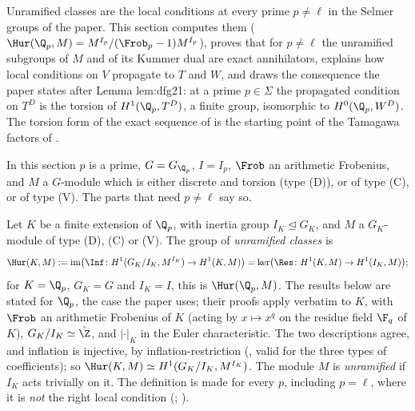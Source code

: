 Unramified classes are the local conditions at every prime $p\ne\ell$ in the Selmer groups of the paper. This section computes them
($\Hur(\Q_p,M)=M^{I_p}/(\Frob_p-1)M^{I_p}$), proves that for $p\ne\ell$ the unramified subgroups of $M$ and of its Kummer dual are exact annihilators, explains how local
conditions on $V$ propagate to $T$ and $W$, and draws the consequence the paper states after Lemma lem:dfg21: at a prime $p\in\Sigma$ the propagated condition
on $T^D$ is the torsion of $H^1(\Q_p,T^D)$, a finite group, isomorphic to $H^0(\Q_p,W^D)$. The torsion form of the exact sequence of 
is the starting point of the Tamagawa factors of .

In this section $p$ is a prime, $G=G_{\Q_p}$, $I=I_p$, $\Frob$ an arithmetic Frobenius, and $M$ a $G$-module which is either discrete and torsion (type (D)), or of
type (C), or of type (V). The parts that need $p\ne\ell$ say so.

\begin{definition}\label{def:galcoh:unramified}
Let $K$ be a finite extension of $\Q_p$, with inertia group $I_K\trianglelefteq G_K$, and $M$ a $G_K$-module of type (D), (C) or (V). The group of \emph{unramified classes} is
\[
\Hur(K,M):=\operatorname{im}\bigl(\Inf\colon H^1(G_K/I_K,M^{I_K})\to H^1(K,M)\bigr)=\ker\bigl(\Res\colon H^1(K,M)\to H^1(I_K,M)\bigr);
\]
for $K=\Q_p$, $G_K=G$ and $I_K=I$, this is $\Hur(\Q_p,M)$. The results below are stated for $\Q_p$, the case the paper uses; their proofs apply verbatim to $K$, with
$\Frob$ an arithmetic Frobenius of $K$ (acting by $x\mapsto x^{q}$ on the residue field $\F_q$ of $K$), $G_K/I_K\simeq\hat\Z$, and $|\cdot|_K$ in the Euler characteristic.
The two descriptions agree, and inflation is injective, by inflation-restriction (, valid for the three types of coefficients); so
$\Hur(K,M)\simeq H^1(G_K/I_K,M^{I_K})$. The module $M$ is \emph{unramified} if $I_K$ acts trivially on it. The definition is made for every $p$, including $p=\ell$, where it is
\emph{not} the right local condition (; ).
\end{definition}

